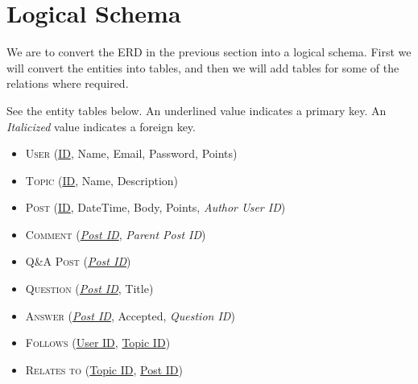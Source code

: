 \newcommand{\key}[1]{\underline{#1}}
\newcommand{\fkey}[1]{\textit{#1}}

\section{Logical Schema}

We are to convert the ERD in the previous section into a logical schema. First we will convert the entities into tables, and then we will add tables for some of the relations where required.

See the entity tables below. An underlined value indicates a primary key. An \emph{Italicized} value indicates a foreign key.

\begin{itemize}
    \item[] \textsc{User} (\key{ID}, Name, Email, Password, Points)
    \item[] \textsc{Topic} (\key{ID}, Name, Description)
    \item[] \textsc{Post} (\key{ID}, DateTime, Body, Points, \fkey{Author User ID})
    \item[] \textsc{Comment} (\key{\fkey{Post ID}}, \fkey{Parent Post ID})
    \item[] \textsc{Q\&A Post} (\key{\fkey{Post ID}})
    \item[] \textsc{Question} (\key{\fkey{Post ID}}, Title)
    \item[] \textsc{Answer} (\key{\fkey{Post ID}}, Accepted, \fkey{Question ID})
    \item[] \textsc{Follows} (\key{User ID}, \key{Topic ID})
    \item[] \textsc{Relates to} (\key{Topic ID}, \key{Post ID})
\end{itemize}